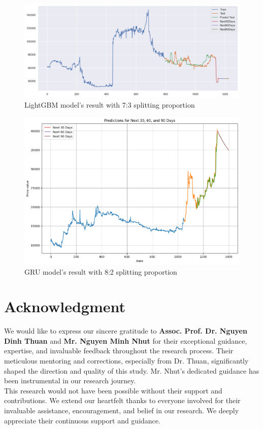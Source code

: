 \documentclass{ieeeojies}
\begin{document}
\begin{figure}[H]
  \centering
  \begin{minipage}{0.8\linewidth}
    \centering
    \includegraphics[width=\linewidth]{bibliography/Figure/LightGBM_DHT(7_3).png}
    \caption{LightGBM model's result with 7:3 splitting proportion}
    \label{fig8}
  \end{minipage}
\end{figure}

\begin{figure}[H]
  \centering
  \begin{minipage}{0.8\linewidth}
    \centering
    \includegraphics[width=\linewidth]{bibliography/Figure/DHT_GRU.png}
    \caption{GRU model's result with 8:2 splitting proportion}
    \label{fig8}
  \end{minipage}
\end{figure}

\section*{Acknowledgment}
We would like to express our sincere gratitude to \textbf{Assoc. Prof. Dr. Nguyen Dinh Thuan} and \textbf{Mr. Nguyen Minh Nhut} for their exceptional guidance, expertise, and invaluable feedback throughout the research process. Their meticulous mentoring and corrections, especially from Dr. Thuan, significantly shaped the direction and quality of this study. Mr. Nhut's dedicated guidance has been instrumental in our research journey.
\\This research would not have been possible without their support and contributions. We extend our heartfelt thanks to everyone involved for their invaluable assistance, encouragement, and belief in our research. We deeply appreciate their continuous support and guidance.
\end{document}
